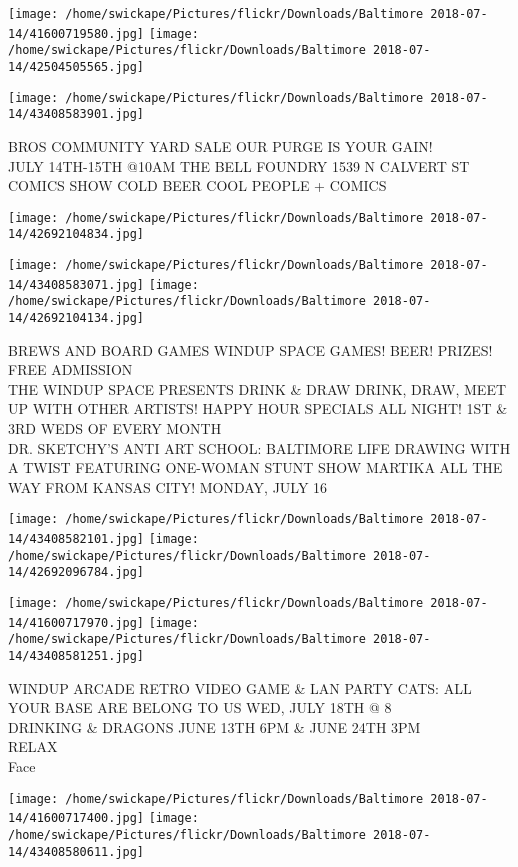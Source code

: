 \documentclass[10pt,letterpaper]{article}
\begin{document}
\texttt{[image: /home/swickape/Pictures/flickr/Downloads/Baltimore 2018-07-14/41600719580.jpg]}
\texttt{[image: /home/swickape/Pictures/flickr/Downloads/Baltimore 2018-07-14/42504505565.jpg]}

\texttt{[image: /home/swickape/Pictures/flickr/Downloads/Baltimore 2018-07-14/43408583901.jpg]}

BROS COMMUNITY YARD SALE OUR PURGE IS YOUR GAIN!\\
JULY 14TH{-}15TH @10AM THE BELL FOUNDRY 1539 N CALVERT ST\\
COMICS SHOW COLD BEER COOL PEOPLE + COMICS
\pagebreak

\texttt{[image: /home/swickape/Pictures/flickr/Downloads/Baltimore 2018-07-14/42692104834.jpg]}

\vspace{0.25in}
\texttt{[image: /home/swickape/Pictures/flickr/Downloads/Baltimore 2018-07-14/43408583071.jpg]}
\texttt{[image: /home/swickape/Pictures/flickr/Downloads/Baltimore 2018-07-14/42692104134.jpg]}

BREWS AND BOARD GAMES WINDUP SPACE GAMES!  BEER!  PRIZES!  FREE ADMISSION\\
THE WINDUP SPACE PRESENTS DRINK \& DRAW DRINK, DRAW, MEET UP WITH OTHER ARTISTS!  HAPPY HOUR SPECIALS ALL NIGHT!  1ST \& 3RD WEDS OF EVERY MONTH\\
DR. SKETCHY'S ANTI ART SCHOOL: BALTIMORE LIFE DRAWING WITH A TWIST FEATURING ONE{-}WOMAN STUNT SHOW MARTIKA ALL THE WAY FROM KANSAS CITY! MONDAY, JULY 16
\pagebreak

\texttt{[image: /home/swickape/Pictures/flickr/Downloads/Baltimore 2018-07-14/43408582101.jpg]}
\texttt{[image: /home/swickape/Pictures/flickr/Downloads/Baltimore 2018-07-14/42692096784.jpg]}

\texttt{[image: /home/swickape/Pictures/flickr/Downloads/Baltimore 2018-07-14/41600717970.jpg]}
\texttt{[image: /home/swickape/Pictures/flickr/Downloads/Baltimore 2018-07-14/43408581251.jpg]}

WINDUP ARCADE RETRO VIDEO GAME \& LAN PARTY CATS: ALL YOUR BASE ARE BELONG TO US WED, JULY 18TH @ 8\\
DRINKING \& DRAGONS JUNE 13TH 6PM \& JUNE 24TH 3PM\\
RELAX\\
Face
\pagebreak

\texttt{[image: /home/swickape/Pictures/flickr/Downloads/Baltimore 2018-07-14/41600717400.jpg]}
\texttt{[image: /home/swickape/Pictures/flickr/Downloads/Baltimore 2018-07-14/43408580611.jpg]}
\end{document}
